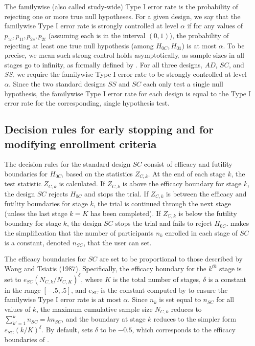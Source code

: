 \documentclass[article]{jss}
\begin{document}
The familywise (also called study-wide) Type I error rate is the probability of rejecting one or more true null hypotheses.
For a given design, we say that the familywise Type I error rate is strongly controlled at level $α$ if 
for any values of  $p_{1c},p_{1t},p_{2c},p_{2t}$ (assuming each is in the interval $(0,1)$), 
the probability of rejecting at least one true null hypothesis (among $H_{0C}, H_{01}$) is at most $α$. To be precise, we mean such strong control holds asymptotically, as sample sizes in all stages go to infinity, as formally defined by \cite{Rosenblum2013AdaptMISTIE}. %
For all three designs, $AD$, $SC$, and $SS$, we require the familywise Type I error rate to be strongly controlled at level $α$. 
Since the two standard designs $SS$ and $SC$ each only test a single null hypothesis, the familywise Type I error rate for each design is equal to the  Type I error rate for the corresponding, single hypothesis test.





\subsection{Decision rules for early stopping and for modifying enrollment criteria}
\label{sub:decisionRules}


The decision rules for the standard design $SC$ consist of efficacy and futility boundaries for $H_{0C}$, based on the statistics $Z_{C,k}$. At the end of each stage $k$,  the test statistic $Z_{C,k}$ is calculated. If $Z_{C,k}$ is above the efficacy boundary for stage $k$, the design $SC$ rejects $H_{0C}$ and stops the trial. If $Z_{C,k}$ is between the efficacy and futility boundaries for stage $k$, the trial is continued through the next stage (unless the last stage $k=K$ has been completed). If $Z_{C,k}$ is below the futility boundary for stage $k$, the design $SC$ stops the trial and fails to reject $H_{0C}$.  makes the simplification that the number of participants $n_k$ enrolled in each stage of $SC$ is a constant, denoted  $n_{SC}$, that the user can set.

The efficacy boundaries for $SC$ are set to be proportional to those described by Wang and Tsiatis (1987). Specifically, the efficacy boundary for the $k^{th}$ stage is set to $e_{SC}(N_{C,k}/N_{C,K})^{\delta}$, where $K$ is the total number of stages, $δ$ is a constant in the range $[-.5,.5]$, and $e_{SC}$ is the constant computed by    to ensure the familywise Type I error rate is at most $\alpha$. Since $n_{k}$ is set equal to $n_{SC}$ for all values of $k$, the maximum cumulative sample size $N_{C,k}$ reduces to $\sum_{k'=1}^k n_{SC}=k n_{SC}$, and the boundary at stage $k$ reduces to the simpler form $e_{SC}(k/K)^\delta$. By default,  sets $\delta$ to be $-0.5$, which corresponds to the efficacy boundaries of \cite{obrienfleming}. 
\end{document}
